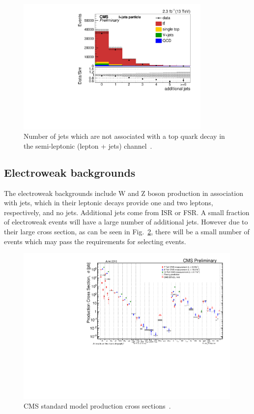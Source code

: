 \begin{figure}[ht!]
\begin{center}
    \includegraphics[width=0.85\textwidth]{images/Theory/ttbarAdd.pdf}
    \caption{Number of jets which are not associated with a top quark decay in the \ttbar semi-leptonic (lepton + jets) channel~\cite{CMS-PAS-TOP-16-008}.}
    \label{fig:ttbarAdd}
\end{center}
\end{figure}

\subsection{Electroweak backgrounds}
The electroweak backgrounds include W and Z boson production in association with jets, which in their leptonic decays provide one and two leptons, respectively, and no jets. Additional jets come from ISR or FSR. A small fraction of electroweak events will have a large number of additional jets. However due to their large cross section, as can be seen in Fig.~\ref{fig:CMSstairway}, there will be a small number of events which may pass the requirements for selecting \tttt events.
\begin{figure}[ht!]
\begin{center}
    \includegraphics[width=0.99\textwidth]{images/Theory/stairway.pdf}
    \caption{CMS standard model production cross sections~\cite{stairwaytwiki}.}
    \label{fig:CMSstairway}
\end{center}
\end{figure}

